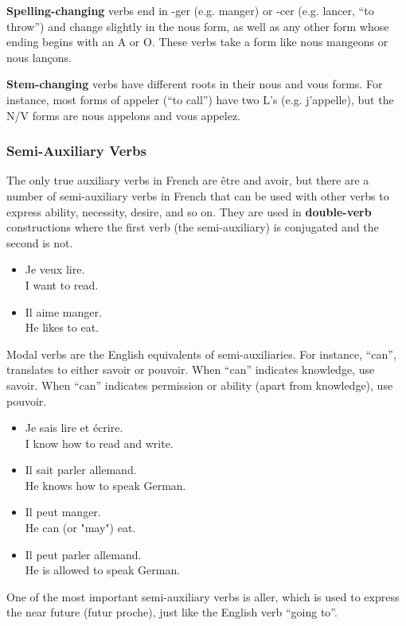 \textbf{Spelling-changing} verbs end in -ger (e.g. manger) or -cer (e.g. lancer, ``to throw'') and change slightly in the nous form, as well as any other form whose ending begins with an A or O. These verbs take a form like nous mangeons or nous lan{\c c}ons.

\textbf{Stem-changing} verbs have different roots in their nous and vous forms. For instance, most forms of appeler (``to call'') have two L's (e.g. j'appelle), but the N/V forms are nous appelons and vous appelez. 

\subsubsection{Semi-Auxiliary Verbs}

The only true auxiliary verbs in French are {\^e}tre and avoir, but there are a number of semi-auxiliary verbs in French that can be used with other verbs to express ability, necessity, desire, and so on. They are used in \textbf{double-verb} constructions where the first verb (the semi-auxiliary) is conjugated and the second is not.

\begin{itemize}
  \item  Je veux lire. \\ I want to read.
  \item  Il aime manger. \\ He likes to eat.
\end{itemize}

Modal verbs are the English equivalents of semi-auxiliaries.  For instance, ``can'', translates to either savoir or pouvoir. When ``can'' indicates knowledge, use savoir.  When ``can'' indicates permission or ability (apart from knowledge), use pouvoir.

\begin{itemize}
  \item  Je sais lire et {\'e}crire. \\ I know how to read and write.
  \item  Il sait parler allemand. \\ He knows how to speak German.
  \item  Il peut manger. \\ He can (or "may") eat.
  \item  Il peut parler allemand. \\ He is allowed to speak German.
\end{itemize}

One of the most important semi-auxiliary verbs is aller, which is used to express the near future (futur proche), just like the English verb ``going to''. 

